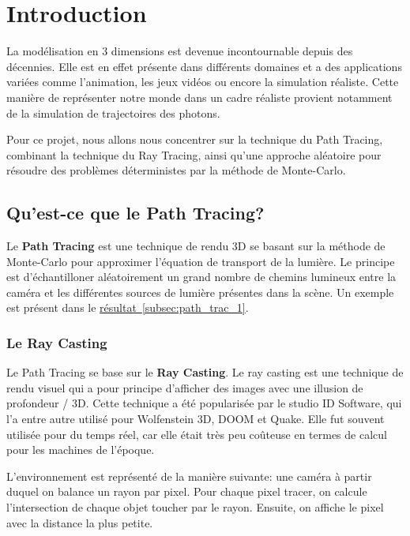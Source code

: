 \section{Introduction}

La modélisation en 3 dimensions est devenue incontournable depuis des décennies. Elle est en effet présente dans différents domaines et a des applications variées comme l'animation, les jeux vidéos ou encore la simulation réaliste. Cette manière de représenter notre monde dans un cadre réaliste provient notamment de la simulation de trajectoires des photons.

Pour ce projet, nous allons nous concentrer sur la technique du Path Tracing, combinant la technique du Ray Tracing, ainsi qu'une approche aléatoire pour résoudre des problèmes déterministes par la méthode de Monte-Carlo.

\subsection{Qu'est-ce que le Path Tracing?}

Le \textbf{Path Tracing} est une technique de rendu 3D se basant sur la méthode de Monte-Carlo pour approximer l'équation de transport de la lumière. Le principe est d'échantilloner aléatoirement un grand nombre de chemins lumineux entre la caméra et les différentes sources de lumière présentes dans la scène. Un exemple est présent dans le \hyperref[subsec:path_trac_1]{résultat~\ref*{subsec:path_trac_1}}.

\subsubsection{Le Ray Casting}

Le Path Tracing se base sur le \textbf{Ray Casting}. 
Le ray casting est une technique de rendu visuel qui a pour principe d'afficher des images avec une illusion de profondeur / 3D. Cette technique a été popularisée par le studio ID Software, qui l'a entre autre utilisé pour Wolfenstein 3D, DOOM et Quake. 
Elle fut souvent utilisée pour du temps réel, car elle était très peu coûteuse en termes de calcul pour les machines de l'époque.

L'environnement est représenté de la manière suivante: une caméra à partir duquel on balance un rayon par pixel. Pour chaque pixel tracer, on calcule l'intersection de chaque objet toucher par le rayon. Ensuite, on affiche le pixel avec la distance la plus petite.

